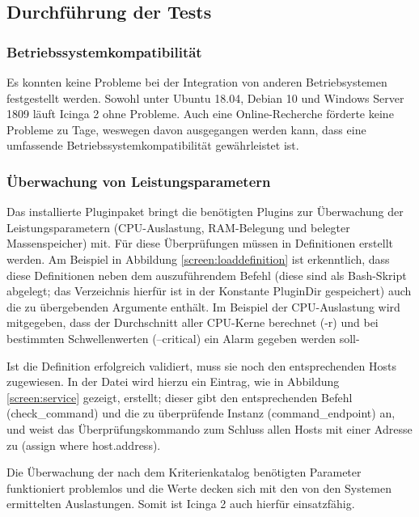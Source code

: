 \subsection{Durchführung der Tests}
\label{sec:DurchführungTests}

\subsubsection{Betriebssystemkompatibilität}
\label{sec:oscompatibility}
Es konnten keine Probleme bei der Integration von anderen Betriebsystemen festgestellt werden. Sowohl unter Ubuntu 18.04, Debian 10 und Windows Server 1809 läuft \glqq{}Icinga 2\grqq{} ohne Probleme. Auch eine Online-Recherche förderte keine Probleme zu Tage, weswegen davon ausgegangen werden kann, dass eine umfassende Betriebssystemkompatibilität gewährleistet ist.

\subsubsection{Überwachung von Leistungsparametern}
\label{sec:ÜberwachungLeistungsparameter}
Das installierte Pluginpaket  bringt die benötigten Plugins zur Überwachung der Leistungsparametern (CPU-Auslastung, RAM-Belegung und belegter Massenspeicher) mit. Für diese Überprüfungen müssen in  Definitionen erstellt werden. Am Beispiel in Abbildung \ref{screen:loaddefinition} ist erkenntlich, dass diese Definitionen neben dem auszuführendem Befehl (diese sind als Bash-Skript abgelegt; das Verzeichnis hierfür ist in der Konstante \glqq{}PluginDir\grqq{} gespeichert) auch die zu übergebenden Argumente enthält. Im Beispiel der CPU-Auslastung wird mitgegeben, dass der Durchschnitt aller CPU-Kerne berechnet (-r) und bei bestimmten Schwellenwerten (--critical) ein Alarm gegeben werden soll-

Ist die Definition erfolgreich validiert, muss sie noch den entsprechenden Hosts zugewiesen. In der Datei  wird hierzu ein Eintrag, wie in Abbildung \ref{screen:service} gezeigt, erstellt; dieser gibt den entsprechenden Befehl (check\_{}command) und die zu überprüfende Instanz (command\_{}endpoint) an, und weist das Überprüfungskommando zum Schluss allen Hosts mit einer Adresse zu (assign where host.address).

Die Überwachung der nach dem Kriterienkatalog benötigten Parameter funktioniert problemlos und die Werte decken sich mit den von den Systemen ermittelten Auslastungen. Somit ist \glqq{}Icinga 2\grqq{} auch hierfür einsatzfähig.

